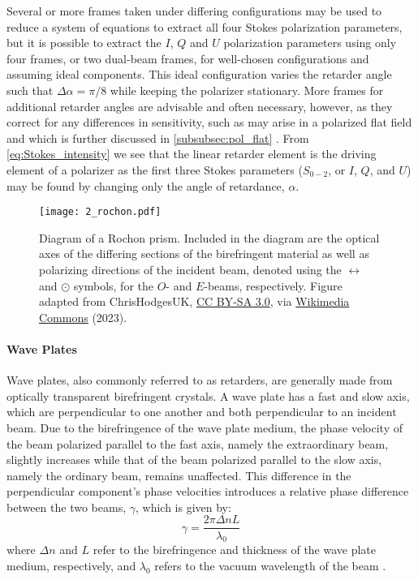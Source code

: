 Several or more frames taken under differing configurations may be used to reduce a system of equations to extract all four Stokes polarization parameters, but it is possible to extract the $I$, $Q$ and $U$ polarization parameters using only four frames, or two dual-beam frames, for well-chosen configurations and assuming ideal components.
This ideal configuration varies the retarder angle such that $\Delta\alpha = \pi / 8$ while keeping the polarizer stationary.
More frames for additional retarder angles are advisable and often necessary, however, as they correct for any differences in sensitivity, such as may arise in a polarized flat field and which is further discussed in \autoref{subsubsec:pol_flat} \citep{polarimetry_error}.
From \autoref{eq:Stokes_intensity} we see that the linear retarder element is the driving element of a polarizer as the first three Stokes parameters ($S_{0-2}$, or $I$, $Q$, and $U$) may be found by changing only the angle of retardance, $\alpha$.

\begin{figure}[t]
    \centering
    \texttt{[image: 2\_rochon.pdf]}
    \caption{
        Diagram of a Rochon prism.
        Included in the diagram are the optical axes of the differing sections of the birefringent material as well as polarizing directions of the incident beam, denoted using the $\leftrightarrow$ and $\odot$ symbols, for the $O$- and $E$-beams, respectively.
        Figure adapted from ChrisHodgesUK, \protect\href{https://creativecommons.org/licenses/by-sa/3.0/}{CC BY-SA 3.0}, via \protect\href{https://commons.wikimedia.org/wiki/File:Rochon_Prism.svg}{Wikimedia Commons} (2023).
    }
    \label{fig:Rochon_prism}
\end{figure}

\paragraph{Wave Plates}
Wave plates, also commonly referred to as retarders, are generally made from optically transparent birefringent crystals.
A wave plate has a fast and slow axis, which are perpendicular to one another and both perpendicular to an incident beam.
Due to the birefringence of the wave plate medium, the phase velocity of the beam polarized parallel to the fast axis, namely the extraordinary beam, slightly increases while that of the beam polarized parallel to the slow axis, namely the ordinary beam, remains unaffected.
This difference in the perpendicular component's phase velocities introduces a relative phase difference between the two beams, $\gamma$, which is given by:
\begin{equation}
    \gamma = \frac{2 \pi \Delta n L}{\lambda_{0}}
\end{equation}
where $\Delta n$ and $L$ refer to the birefringence and thickness of the wave plate medium, respectively, and $\lambda_{0}$ refers to the vacuum wavelength of the beam \citep{Hecht_optics}.

